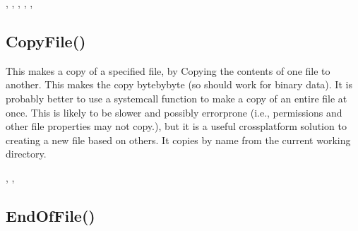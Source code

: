 \documentclass[letterpaper,10pt,english]{sphinxmanual}
\begin{document}
\sphinxAtStartPar
{}

\sphinxAtStartPar
{}, , , , , 

\ignorespaces 

\subsection{CopyFile()}
\label{\detokenize{reference/peblstream:copyfile}}\label{\detokenize{reference/peblstream:index-6}}
\sphinxAtStartPar
{}

\sphinxAtStartPar
{}

\sphinxAtStartPar
This makes a copy of a specified file, by  Copying the contents of one file to another.         This makes the copy byte\sphinxhyphen{}by\sphinxhyphen{}byte (so should work for binary data).  It is probably better to use a systemcall function to make a copy of an entire file at once. This is likely to be slower and possibly error\sphinxhyphen{}prone (i.e., permissions and other file properties may not copy.), but it is a useful cross\sphinxhyphen{}platform solution to creating a new file based on others.  It copies by name from the current working directory.

\sphinxAtStartPar
{}

\begin{sphinxVerbatim}[commandchars=\\\{\}]
\end{sphinxVerbatim}

\sphinxAtStartPar
{}

\sphinxAtStartPar
{},  , 

\ignorespaces 

\subsection{EndOfFile()}
\label{\detokenize{reference/peblstream:endoffile}}\label{\detokenize{reference/peblstream:index-7}}
\sphinxAtStartPar
{}
\end{document}
